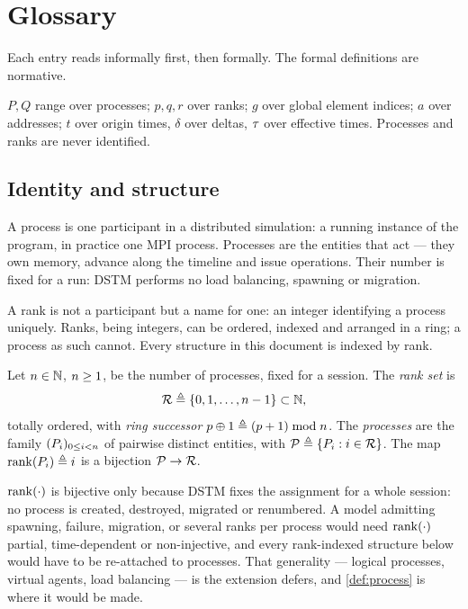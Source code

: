 \section{Glossary}
\label{sec:glossary}

Each entry reads informally first, then formally. The formal definitions are
normative.

\begin{notationx}[Metavariables]\label{not:vars}
$P, Q$ range over processes; $p, q, r$ over ranks; $g$ over global element
indices; $a$ over addresses; $t$ over origin times, $\delta$ over deltas,
$\tau$ over effective times. Processes and ranks are never identified.
\end{notationx}

\subsection{Identity and structure}
\label{sec:gloss-identity}

A process is one participant in a distributed simulation: a running instance
of the program, in practice one MPI process. Processes are the entities that
act --- they own memory, advance along the timeline and issue operations.
Their number is fixed for a run: DSTM performs no load balancing, spawning or
migration.

A rank is not a participant but a name for one: an integer identifying a
process uniquely. Ranks, being integers, can be ordered, indexed and arranged
in a ring; a process as such cannot. Every structure in this document is
indexed by rank.

\begin{definition}\label{def:process}
Let $n \in \mathbb{N}$, $n \ge 1$, be the number of processes,
fixed for a \gls{session}. The \emph{rank set} is
\[
  \mathcal{R} \triangleq \{0, 1, \dots, n - 1\} \subset \mathbb{N} ,
\]
totally ordered, with \emph{ring successor} $p \oplus 1 \triangleq (p+1) \bmod
n$. The \emph{processes} are the family
$(P_{i})_{0 \le i < n}$ of pairwise distinct entities, with
$\mathcal{P} \triangleq \{P_{i} : i \in \mathcal{R}\}$. The map
$\mathrm{rank}(P_{i}) \triangleq i$ is a bijection $\mathcal{P} \to \mathcal{R}$.
\end{definition}

\begin{remark}
\label{rem:rank-process}
$\mathrm{rank}(\cdot)$ is bijective only because DSTM fixes the assignment for a
whole \gls{session}: no process is created, destroyed, migrated or
renumbered. A model admitting spawning, failure, migration, or several ranks
per process would need $\mathrm{rank}(\cdot)$ partial, time-dependent or
non-injective, and every rank-indexed structure below would have to be
re-attached to processes. That generality --- logical processes, virtual
agents, load balancing --- is the extension \cite{dstm2026} defers, and
\cref{def:process} is where it would be made.
\end{remark}

